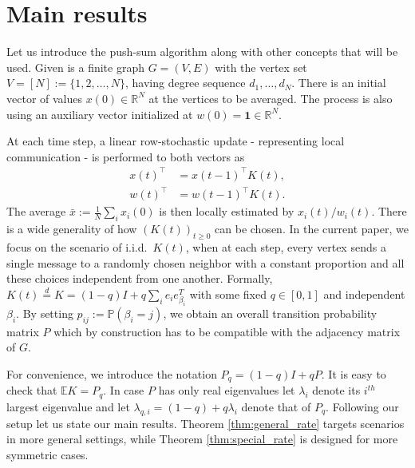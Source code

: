 \documentclass[a4paper,12pt]{article}
\def\1{\mathbf 1}
\def\mR{\mathbb{R}}
\def\mP{\mathbb{P}}
\begin{document}
	\section{Main results}
	
	Let us introduce the push-sum algorithm along with other concepts that will be used.
	Given is a finite graph $G = (V,E)$ with the vertex set $V = [N] := \{1,2,\ldots,N\}$, having degree sequence $d_1,\ldots,d_N$. There is an initial vector of values $x(0)\in \mR^N$ at the vertices to be averaged. The process is also using an auxiliary vector initialized at $w(0) = \1 \in \mR^N$.
	
	At each time step, a linear row-stochastic update - representing local communication - is performed to both vectors as
	\begin{align*}
		x(t)^\top & = x(t-1)^\top K(t),\\
		w(t)^\top & = w(t-1)^\top K(t).
	\end{align*}
	The average $\bar{x}:=\frac 1N \sum_i x_i(0)$ is then locally estimated by $x_i(t)/w_i(t)$. 
	There is a wide generality of how $(K(t))_{t\geq 0}$ can be chosen. In the current paper, we focus on the scenario of i.i.d.\ $K(t)$, when at each step, every vertex sends a single message to a randomly chosen neighbor with a constant proportion and all these choices independent from one another. Formally, $K(t) \stackrel{d}{=} K = (1-q)I + q\sum_{i} e_ie_{\beta_i}^T$ with some fixed $q\in [0,1]$ and independent $\beta_i$. By setting $p_{ij}:=\mP(\beta_i=j)$, we obtain an overall transition probability matrix $P$ which by construction has to be compatible with the adjacency matrix of $G$.
	
	For convenience, we introduce the notation $P_q = (1-q)I + qP$.  It is easy to check that $\mathbb E K= P_q$. In case $P$ has only real eigenvalues let $\lambda_i$ denote its $i^{th}$ largest eigenvalue and let $\lambda_{q,i}=(1-q) + q\lambda_i$ denote that of $P_q$. Following our setup let us state our main results. Theorem \ref{thm:general_rate} targets scenarios in more general settings, while Theorem \ref{thm:special_rate} is designed for more symmetric cases.
	
\end{document}
